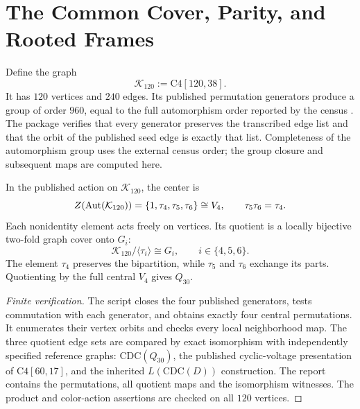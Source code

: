 \begingroup
\renewcommand{\thesection}{2B}
\section{The Common Cover, Parity, and Rooted Frames}\label{sec:commoncover}
Define the graph
\begin{equation}
\mathcal K_{120}:=\mathrm{C4}[120,38].
\tag{F3}\label{eq:commoncover}
\end{equation}
It has $120$ vertices and $240$ edges. Its published permutation generators produce a group of order $960$, equal to the full automorphism order reported by the census \citep{c412038,c412038forms}. The package verifies that every generator preserves the transcribed edge list and that the orbit of the published seed edge is exactly that list. Completeness of the automorphism group uses the external census order; the group closure and subsequent maps are computed here.

\begin{proposition}\label{prop:centralfaces}
In the published action on $\mathcal K_{120}$, the center is
\[
Z(\operatorname{Aut}(\mathcal K_{120}))=
\{1,\tau_4,\tau_5,\tau_6\}\cong V_4,
\qquad \tau_5\tau_6=\tau_4.
\]
Each nonidentity element acts freely on vertices. Its quotient is a locally bijective two-fold graph cover onto $G_i$:
\begin{equation}
\mathcal K_{120}/\langle\tau_i\rangle\cong G_i,
\qquad i\in\{4,5,6\}.
\tag{F4}\label{eq:threequotients}
\end{equation}
The element $\tau_4$ preserves the bipartition, while $\tau_5$ and $\tau_6$ exchange its parts. Quotienting by the full central $V_4$ gives $Q_{30}$.
\end{proposition}
\begin{proof}[Finite verification]
The script  closes the four published generators, tests commutation with each generator, and obtains exactly four central permutations. It enumerates their vertex orbits and checks every local neighborhood map. The three quotient edge sets are compared by exact isomorphism with independently specified reference graphs: $\mathrm{CDC}(Q_{30})$, the published cyclic-voltage presentation of $\mathrm{C4}[60,17]$, and the inherited $L(\mathrm{CDC}(D))$ construction. The report contains the permutations, all quotient maps and the isomorphism witnesses. The product and color-action assertions are checked on all $120$ vertices.
\end{proof}


